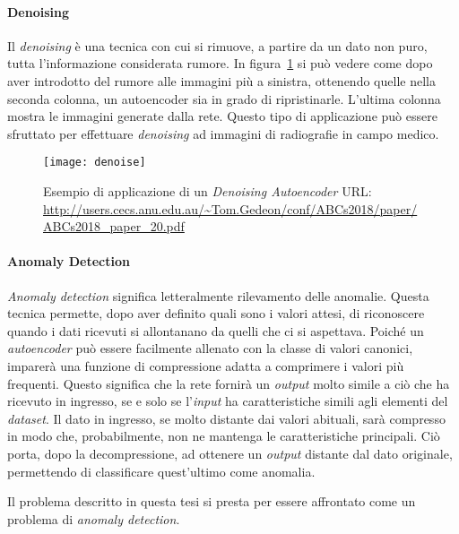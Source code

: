 \paragraph{Denoising}
Il \textit{denoising} è una tecnica con cui si rimuove, a partire da un dato non puro, tutta l'informazione considerata rumore.
In figura~\ref{fig:denoise_example} si può vedere come dopo aver introdotto del rumore alle immagini più a sinistra, ottenendo quelle nella seconda colonna, un autoencoder sia in grado di ripristinarle.
L'ultima colonna mostra le immagini generate dalla rete.
Questo tipo di applicazione può essere sfruttato per effettuare \textit{denoising} ad immagini di radiografie in campo medico.
\begin{figure}[ht]
  \begin{center}
    \texttt{[image: denoise]}
  \end{center}
  \caption{Esempio di applicazione di un \textit{Denoising Autoencoder} URL: \url{http://users.cecs.anu.edu.au/~Tom.Gedeon/conf/ABCs2018/paper/ABCs2018_paper_20.pdf}}
  \label{fig:denoise_example}
\end{figure}


\paragraph{Anomaly Detection}
\textit{Anomaly detection} significa letteralmente rilevamento delle anomalie.
Questa tecnica permette, dopo aver definito quali sono i valori attesi, di riconoscere quando i dati ricevuti si allontanano da quelli che ci si aspettava.
Poiché un \textit{autoencoder} può essere facilmente allenato con la classe di valori canonici, imparerà una funzione di compressione adatta a comprimere i valori più frequenti.
Questo significa che la rete fornirà un \textit{output} molto simile a ciò che ha ricevuto in ingresso, se e solo se l'\textit{input} ha caratteristiche simili agli elementi del \textit{dataset}.
Il dato in ingresso, se molto distante dai valori abituali, sarà compresso in modo che, probabilmente, non ne mantenga le caratteristiche principali.
Ciò porta, dopo la decompressione, ad ottenere un \textit{output} distante dal dato originale, permettendo di classificare quest'ultimo come anomalia.

Il problema descritto in questa tesi si presta per essere affrontato come un problema di \textit{anomaly detection}.
